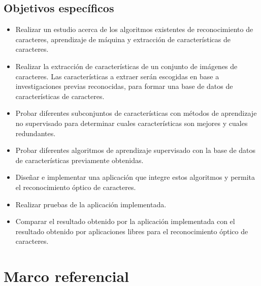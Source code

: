 \documentclass[a4paper, 11pt, oneside]{article}
\begin{document}
	\subsection{Objetivos específicos}
	\begin{itemize}
	\item Realizar un estudio acerca de los algoritmos existentes de reconocimiento de caracteres, aprendizaje de máquina y
	extracción de características de caracteres.
	\item Realizar la extracción de características de un conjunto de imágenes de caracteres. Las características a extraer serán escogidas
	en base a investigaciones previas reconocidas, para formar una base de datos de características de caracteres.
	\item Probar diferentes subconjuntos de características con métodos de aprendizaje no supervisado para determinar cuales 
	características son	mejores y cuales redundantes.
	\item Probar diferentes algoritmos de aprendizaje supervisado con la base de datos de características previamente obtenidas. 
	\item Diseñar e implementar una aplicación que integre estos algoritmos y permita el reconocimiento óptico de caracteres.
	\item Realizar pruebas de la aplicación implementada.
	\item Comparar el resultado obtenido por la aplicación implementada con el resultado obtenido por aplicaciones libres para
	el reconocimiento óptico de caracteres.
	\end{itemize}
	\clearpage
	
	\section{Marco referencial}
	
\end{document}
